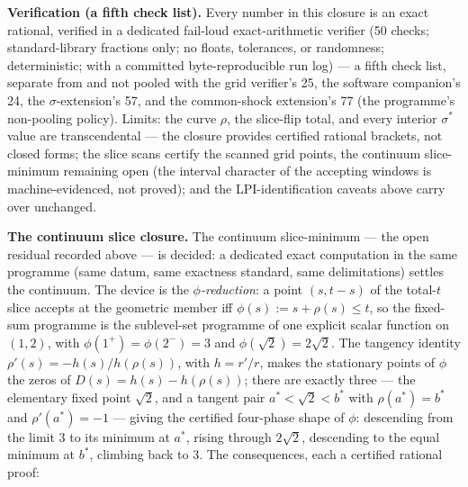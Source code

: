 \documentclass[3p,11pt]{elsarticle}
\begin{document}
\textbf{Verification (a fifth check list).} Every
number in this closure is an exact rational, verified in a
dedicated fail-loud exact-arithmetic verifier (50 checks;
standard-library fractions only; no floats, tolerances, or
randomness; deterministic; with a committed byte-reproducible run
log) --- a fifth check list, separate from and not pooled with
the grid verifier's 25, the software companion's 24, the
\(\sigma\)-extension's 57, and the common-shock extension's 77
(the programme's non-pooling policy). Limits: the curve \(\rho\), the slice-flip
total, and every interior \(\sigma^*\) value are transcendental
--- the closure provides certified rational brackets, not closed
forms; the slice scans certify the scanned grid points, the
continuum slice-minimum remaining open (the
interval character of the accepting windows is
machine-evidenced, not proved); and the LPI-identification
caveats above carry over unchanged.

\textbf{The continuum slice closure.} The continuum slice-minimum
--- the open residual recorded above --- is decided: a dedicated
exact computation in the same programme (same datum, same
exactness standard, same delimitations) settles the continuum.
The device is the
\emph{\(\phi\)-reduction}: a point \((s, t-s)\) of the total-\(t\)
slice accepts at the geometric member iff
\(\phi(s) := s + \rho(s) \le t\), so the fixed-sum programme is the
sublevel-set programme of one explicit scalar function on
\((1,2)\), with \(\phi(1^+) = \phi(2^-) = 3\) and
\(\phi(\sqrt{2}) = 2\sqrt{2}\). The tangency identity
\(\rho'(s) = -h(s)/h(\rho(s))\), with \(h = r'/r\), makes the
stationary points of \(\phi\) the zeros of
\(D(s) = h(s) - h(\rho(s))\); there are exactly three --- the
elementary fixed point \(\sqrt{2}\), and a tangent pair
\(a^{*} < \sqrt{2} < b^{*}\) with \(\rho(a^{*}) = b^{*}\) and
\(\rho'(a^{*}) = -1\) --- giving the certified four-phase shape of
\(\phi\): descending from the limit \(3\) to its minimum at
\(a^{*}\), rising through \(2\sqrt{2}\), descending to the equal
minimum at \(b^{*}\), climbing back to \(3\). The consequences, each
a certified rational proof:
\end{document}
